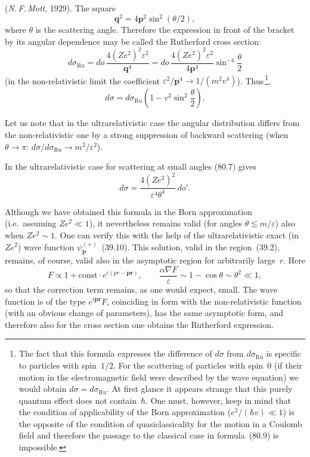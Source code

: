 (\textit{N.\,F.\,Mott}, 1929). The square
\[
\mathbf{q}^2 = 4\mathbf{p}^2\sin^2(\theta/2),
\]
where $\theta$ is the scattering angle. Therefore the expression in front of the bracket by its angular dependence may be called the Rutherford cross section:
\begin{equation}
d\sigma_\text{Ru} = do\,\frac{4(Ze^2)^2\varepsilon^2}{\mathbf{q}^4} = do\,\frac{4(Ze^2)^2\varepsilon^2}{4\mathbf{p}^4}\sin^{-4}\frac{\theta}{2}
\tag{80.8}
\end{equation}
(in the non-relativistic limit the coefficient $\varepsilon^2/\mathbf{p}^4 \to 1/(m^2 v^4)$).
Thus\,\footnote{The fact that this formula expresses the difference of $d\sigma$ from $d\sigma_\text{Ru}$ is specific to particles with spin~$1/2$. For the scattering of particles with spin~0 (if their motion in the electromagnetic field were described by the wave equation) we would obtain $d\sigma = d\sigma_\text{Ru}$. At first glance it appears strange that this purely quantum effect does not contain~$\hbar$. One must, however, keep in mind that the condition of applicability of the Born approximation ($e^2/(\hbar v) \ll 1$) is the opposite of the condition of quasiclassicality for the motion in a Coulomb field and therefore the passage to the classical case in formula~(80.9) is impossible.},
\begin{equation}
d\sigma = d\sigma_\text{Ru}\left(1 - v^2\sin^2\frac{\theta}{2}\right).
\tag{80.9}
\end{equation}

Let us note that in the ultrarelativistic case the angular distribution differs from the non-relativistic one by a strong suppression of backward scattering (when $\theta \to \pi$: $d\sigma/d\sigma_\text{Ru} \to m^2/\varepsilon^2$).

In the ultrarelativistic case for scattering at small angles (80.7) gives
\begin{equation}
d\sigma = \frac{4(Ze^2)^2}{\varepsilon^4\theta^4}\,do'.
\tag{80.10}
\end{equation}

Although we have obtained this formula in the Born approximation (i.e.\ assuming $Ze^2 \ll 1$), it nevertheless remains valid (for angles $\theta \lesssim m/\varepsilon$) also when $Ze^2 \sim 1$. One can verify this with the help of the ultrarelativistic exact (in $Ze^2$) wave function $\psi_{\mathbf{p}}^{(+)}$~(39.10). This solution, valid in the region~(39.2), remains, of course, valid also in the asymptotic region for arbitrarily large~$r$. Here
\[
F \propto 1 + \text{const}\cdot e^{i(pr-\mathbf{pr})},\qquad \frac{\alpha\nabla F}{\varepsilon} \sim 1 - \cos\theta \sim \theta^2 \ll 1,
\]
so that the correction term remains, as one would expect, small. The wave function is of the type $e^{i\mathbf{pr}}F$, coinciding in form with the non-relativistic function (with an obvious change of parameters), has the same asymptotic form, and therefore also for the cross section one obtains the Rutherford expression.

